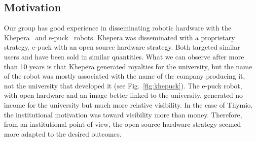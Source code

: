 \documentclass[letterpaper, 10 pt, conference]{ieeeconf}  %
\begin{document}
\subsection{Motivation}

Our group has good experience in disseminating robotic hardware with the Khepera~\cite{MonFraIen93} and e-puck~\cite{mondada2009puck} robots.
Khepera was disseminated with a proprietary strategy, e-puck with an open source hardware strategy.
Both targeted similar users and have been sold in similar quantities.
What we can observe after more than 10 years is that Khepera generated royalties for the university, but the name of the robot was mostly associated with the name of the company producing it, not the university that developed it (see Fig.~\ref{fig:khepuck}).
The e-puck robot, with open hardware and an image better linked to the university, generated no income for the university but much more relative visibility.
In the case of Thymio, the institutional motivation was toward visibility more than money. 
Therefore, from an institutional point of view, the open source hardware strategy seemed more adapted to the desired outcomes.
\end{document}
